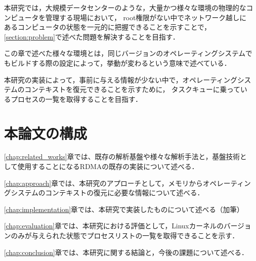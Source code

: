 本研究では，大規模データセンターのような，大量かつ様々な環境の物理的なコンピュータを管理する現場において，
root権限がない中でネットワーク越しにあるコンピュータの状態を一元的に把握できることを示すことで，\ref{section:problem}で述べた問題を解決することを目指す．

この章で述べた様々な環境とは，同じバージョンのオペレーティングシステムでもビルドする際の設定によって，挙動が変わるという意味で述べている．

本研究の実装によって，事前に与える情報が少ない中で，オペレーティングシステムのコンテキストを復元できることを示すために，
タスクキューに乗っているプロセスの一覧を取得することを目指す．





\section{本論文の構成}

\ref{chap:related_works}章では、既存の解析基盤や様々な解析手法と，基盤技術として使用することになるRDMAの既存の実装について述べる．

\ref{chap:approach}章では、本研究のアプローチとして，メモリからオペレーティングシステムのコンテキストの復元に必要な情報について述べる．

\ref{chap:implementation}章では、本研究で実装したものについて述べる（加筆）

\ref{chap:evaluation}章では、本研究における評価として，Linuxカーネルのバージョンのみが与えられた状態でプロセスリストの一覧を取得できることを示す．

\ref{chap:conclusion}章では、本研究に関する結論と，今後の課題について述べる．
